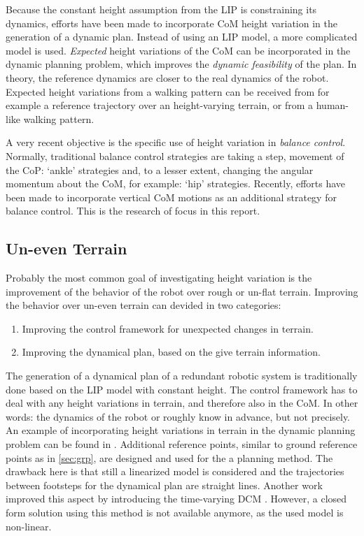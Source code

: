 Because the constant height assumption from the \ac{LIP} is constraining its dynamics, efforts have been made to incorporate CoM height variation in the generation of a dynamic plan. Instead of using an LIP model, a more complicated model is used. \textit{Expected} height variations of the CoM can be incorporated in the dynamic planning problem, which improves the \textit{dynamic feasibility} of the plan. In theory, the reference dynamics are closer to the real dynamics of the robot. Expected height variations from a walking pattern can be received from for example a reference trajectory over an height-varying terrain, or from a human-like walking pattern. 

A very recent objective is the specific use of height variation in \textit{balance control}. Normally, traditional balance control strategies are taking a step, movement of the \ac{CoP}: `ankle' strategies and, to a lesser extent, changing the angular momentum about the \ac{CoM}, for example: `hip' strategies. Recently, efforts have been made to incorporate vertical \ac{CoM} motions as an additional strategy for balance control. This is the research of focus in this report.

\subsection{Un-even Terrain}
Probably the most common goal of investigating height variation is the improvement of the behavior of the robot over rough or un-flat terrain. Improving the behavior over un-even terrain can devided in two categories:
\begin{enumerate}
	\item Improving the control framework for unexpected changes in terrain.
	\item Improving the dynamical plan, based on the give terrain information.
\end{enumerate} 
The generation of a dynamical plan of a redundant robotic system is traditionally done based on the \ac{LIP} model with constant height. The control framework has to deal with any height variations in terrain, and therefore also in the \ac{CoM}. In other words: the dynamics of the robot or roughly know in advance, but not precisely.\\
An example of incorporating height variations in terrain in the dynamic planning problem can be found in \cite{englsberger2013three}. Additional reference points, similar to ground reference points as in \ref{sec:grp}, are designed and used for the a planning method. The drawback here is that still a linearized model is considered and the trajectories between footsteps for the dynamical plan are straight lines. Another work improved this aspect by introducing the time-varying \ac{DCM} \cite{hopkins2014humanoid}. However, a closed form solution using this method is not available anymore, as the used model is non-linear.
